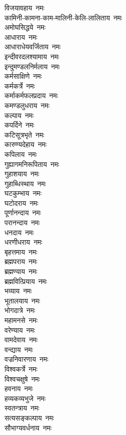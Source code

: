 \begin{multicols}{2}
\begin{flushleft}
विजयावहाय~नमः\\
कामिनी-कामना-काम-मालिनी-केलि-लालिताय~नमः\\
अमोघसिद्धये~नमः\\
आधाराय~नमः\\
आधाराधेयवर्जिताय~नमः\\
इन्दीवरदलश्यामाय~नमः\\
इन्दुमण्डलनिर्मलाय~नमः\\
कर्मसाक्षिणे~नमः\\
कर्मकर्त्रे~नमः\hfill{}\\
कर्माकर्मफलप्रदाय~नमः\\
कमण्डलुधराय~नमः\\
कल्पाय~नमः\\
कपर्दिने~नमः\\
कटिसूत्रभृते~नमः\\
कारुण्यदेहाय~नमः\\
कपिलाय~नमः\\
गुह्यागमनिरूपिताय~नमः\\
गुहाशयाय~नमः\\
गुहाब्धिस्थाय~नमः\hfill{}\\
घटकुम्भाय~नमः\\
घटोदराय~नमः\\
पूर्णानन्दाय~नमः\\
परानन्दाय~नमः\\
धनदाय~नमः\\
धरणीधराय~नमः\\
बृहत्तमाय~नमः\\
ब्रह्मपराय~नमः\\
ब्रह्मण्याय~नमः\\
ब्रह्मवित्प्रियाय~नमः\hfill{}\\
भव्याय~नमः\\
भूतालयाय~नमः\\
भोगदात्रे~नमः\\
महामनसे~नमः\\
वरेण्याय~नमः\\
वामदेवाय~नमः\\
वन्द्याय~नमः\\
वज्रनिवारणाय~नमः\\
विश्वकर्त्रे~नमः\\
विश्वचक्षुषे~नमः\hfill{}\\
हवनाय~नमः\\
हव्यकव्यभुजे~नमः\\
स्वतन्त्राय~नमः\\
सत्यसङ्कल्पाय~नमः\\
सौभाग्यवर्धनाय~नमः\\

\end{flushleft}
\end{multicols}
